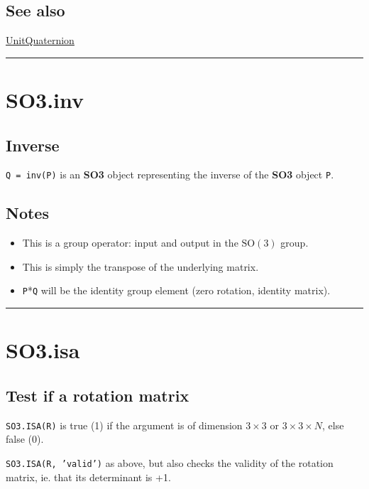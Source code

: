 \subsection*{See also}


\hyperlink{UnitQuaternion}{\color{blue} UnitQuaternion}

\vspace{1.5ex}\hrule

\hypertarget{SO3.inv}{\section*{SO3.inv}}
\subsection*{Inverse}


\texttt{Q = inv(P)} is an \textbf{\color{red} SO3} object representing the inverse of the \textbf{\color{red} SO3} object \texttt{P}.


\subsection*{Notes}
\begin{itemize}
  \item This is a group operator: input and output in the $\mbox{SO}(3)$ group.
  \item This is simply the transpose of the underlying matrix.
  \item \texttt{P}*\texttt{Q} will be the identity group element (zero rotation, identity matrix).
\end{itemize}
\vspace{1.5ex}\hrule

\hypertarget{SO3.isa}{\section*{SO3.isa}}
\subsection*{Test if a rotation matrix}


\texttt{SO3.ISA(R)} is true (1) if the argument is of dimension $3 \times 3$ or $3 \times 3 \times N$, else false (0).



\texttt{SO3.ISA(R, 'valid')} as above, but also checks the validity of the rotation
matrix, ie. that its determinant is +1.


